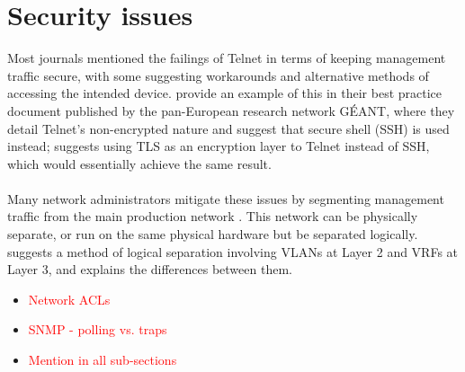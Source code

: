 \section{Security issues}
\label{section:lit-security}
Most journals mentioned the failings of Telnet in terms of keeping management traffic secure, with some suggesting workarounds and alternative methods of accessing the intended device. \cite{geant-bpd-101} provide an example of this in their best practice document published by the pan-European research network GÉANT, where they detail Telnet's non-encrypted nature and suggest that secure shell (SSH) is used instead; \cite{1274255} suggests using TLS as an encryption layer to Telnet instead of SSH, which would essentially achieve the same result. \\\\
Many network administrators mitigate these issues by segmenting management traffic from the main production network \citep{auvik-oobm-network}. This network can be physically separate, or run on the same physical hardware but be separated logically. \cite{plixer-vrf} suggests a method of logical separation involving VLANs at Layer 2 and VRFs at Layer 3, and explains the differences between them.
\begin{itemize}
    \item \textcolor{red}{Network ACLs \citep{geant-bpd-101}}
    \item \textcolor{red}{SNMP - polling vs. traps \citep{386580}}
    \item \textcolor{red}{Mention in all sub-sections}
\end{itemize}
